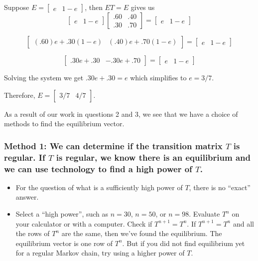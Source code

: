 Suppose \(E=\begin{bmatrix} e & 1-e \end{bmatrix}\), then \(ET=E\) gives us
\[
    \begin{bmatrix}
        e & 1-e
    \end{bmatrix}
    \begin{bmatrix}
        .60 & .40 \\
        .30 & .70
    \end{bmatrix} = \begin{bmatrix}
        e & 1-e
    \end{bmatrix}
\]

\[
    \begin{bmatrix}
        (.60)e + .30(1-e) & (.40)e + .70(1-e)
    \end{bmatrix} = \begin{bmatrix}
        e & 1-e
    \end{bmatrix}
\]

\[
    \begin{bmatrix}
        .30e + .30 & -.30e + .70
    \end{bmatrix} = \begin{bmatrix}
        e & 1-e
    \end{bmatrix}
\]

Solving the system we get \( .30e + .30 = e \) which simplifies to \( e = 3/7 \).

Therefore, \( E=\begin{bmatrix} 3/7 & 4/7 \end{bmatrix} \).

As a result of our work in questions 2 and 3, we see that we have a choice of methods to find the equilibrium vector.

\subsubsection*{Method 1: We can determine if the transition matrix \( T \) is regular. If \( T \) is regular, we know there is an equilibrium and we can use technology to find a high power of \( T \).}
\begin{itemize}
    \item For the question of what is a sufficiently high power of \( T \), there is no “exact” answer.
    \item  Select a “high power”, such as \( n = 30 \), \( n = 50 \), or \( n = 98 \). Evaluate \( T^n \) on your calculator or with a computer. Check if \( T^{n+1} = T^n \). If \( T^{n+1} = T^n \) and all the rows of \( T^n \) are the same, then we’ve found the equilibrium. The equilibrium vector is one row of \( T^n \). But if you did not find equilibrium yet for a regular Markov chain, try using a higher power of \( T \).
\end{itemize}

